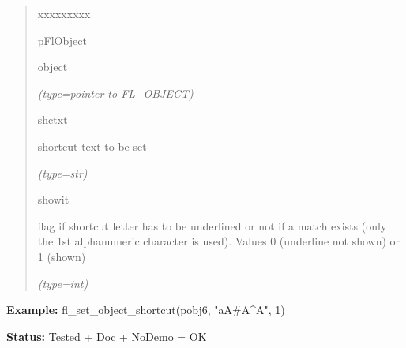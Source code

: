 \begin{boxedminipage}{\funcwidth}
\begin{quote}
\begin{Ventry}{xxxxxxxxx}
          \item[pFlObject]

          object

            {\it (type=pointer to FL\_OBJECT)}

          \item[shctxt]

          shortcut text to be set

            {\it (type=str)}

          \item[showit]

          flag if shortcut letter has to be underlined or not if a match 
          exists (only the 1st alphanumeric character is used). Values 0 
          (underline not shown) or 1 (shown)

            {\it (type=int)}

        \end{Ventry}

      \end{quote}

\textbf{Example:} fl\_set\_object\_shortcut(pobj6, "aA\#A{\textasciicircum}A", 1)



\textbf{Status:} Tested + Doc + NoDemo = OK



    \end{boxedminipage}

    \label{xformslib:flbasic:fl_set_object_shortcutkey}

    \vspace{0.5ex}

